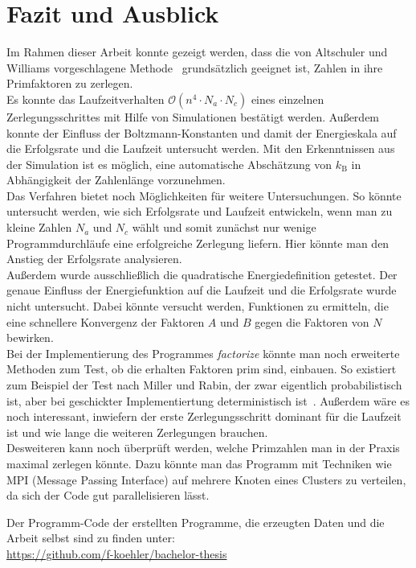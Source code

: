 \chapter{Fazit und Ausblick}\label{ch:conclusion}
Im Rahmen dieser Arbeit konnte gezeigt werden, dass die von Altschuler und Williams vorgeschlagene Methode~\parencite{altschuler} grundsätzlich geeignet ist, Zahlen in ihre Primfaktoren zu zerlegen. \\
Es konnte das Laufzeitverhalten $\mathcal{O}\left(n^4\cdot N_a \cdot N_c\right)$ eines einzelnen Zerlegungsschrittes mit Hilfe von Simulationen bestätigt werden. Außerdem konnte der Einfluss der Boltzmann-Konstanten und damit der Energieskala auf die Erfolgsrate und die Laufzeit untersucht werden. Mit den Erkenntnissen aus der Simulation ist es möglich, eine automatische Abschätzung von $k_\mathrm{B}$ in Abhängigkeit der Zahlenlänge vorzunehmen. \\
Das Verfahren bietet noch Möglichkeiten für weitere Untersuchungen. So könnte untersucht werden, wie sich Erfolgsrate und Laufzeit entwickeln, wenn man zu kleine Zahlen $N_a$ und $N_c$ wählt und somit zunächst nur wenige Programmdurchläufe eine erfolgreiche Zerlegung liefern. Hier könnte man den Anstieg der Erfolgsrate analysieren.\\
Außerdem wurde ausschließlich die quadratische Energiedefinition getestet. Der genaue Einfluss der Energiefunktion auf die Laufzeit und die Erfolgsrate wurde nicht untersucht. Dabei könnte versucht werden, Funktionen zu ermitteln, die eine schnellere Konvergenz der Faktoren $A$ und $B$ gegen die Faktoren von $N$ bewirken.  \\
Bei der Implementierung des Programmes \textit{factorize} könnte man noch erweiterte Methoden zum Test, ob die erhalten Faktoren prim sind, einbauen. So existiert zum Beispiel der Test nach Miller und Rabin, der zwar eigentlich probabilistisch ist, aber bei geschickter Implementiertung deterministisch ist~\parencite{miller}. Außerdem wäre es noch interessant, inwiefern der erste Zerlegungsschritt dominant für die Laufzeit ist und wie lange die weiteren Zerlegungen brauchen. \\
Desweiteren kann noch überprüft werden, welche Primzahlen man in der Praxis maximal zerlegen könnte. Dazu könnte man das Programm mit Techniken wie MPI (Message Passing Interface) auf mehrere Knoten eines Clusters zu verteilen, da sich der Code gut parallelisieren lässt.

\vfill
Der Programm-Code der erstellten Programme, die erzeugten Daten und die Arbeit selbst sind zu finden unter:\\
\url{https://github.com/f-koehler/bachelor-thesis}
